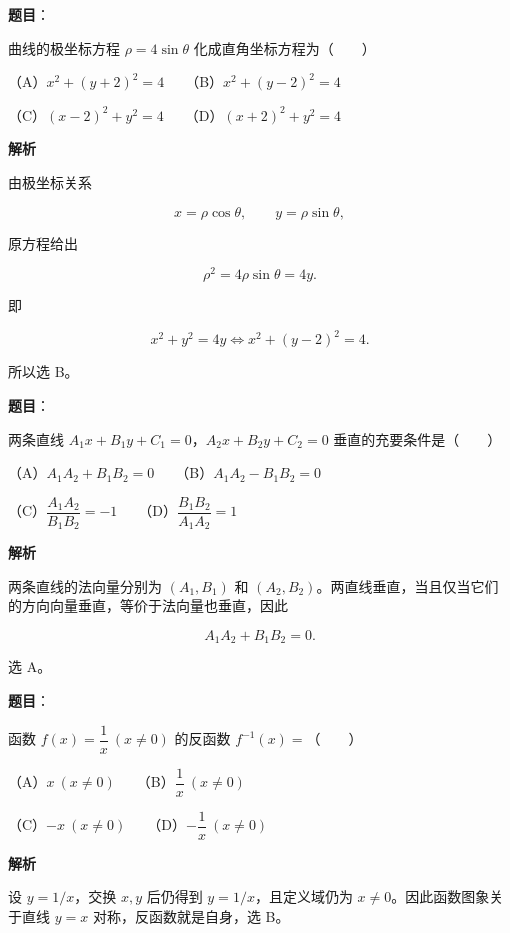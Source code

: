 \begin{answer}

\textbf{题目}：

曲线的极坐标方程 $\rho=4\sin\theta$ 化成直角坐标方程为\mbox{（　　）}

（A）$x^2+(y+2)^2=4$　　（B）$x^2+(y-2)^2=4$

（C）$(x-2)^2+y^2=4$　　（D）$(x+2)^2+y^2=4$

\textbf{解析}

由极坐标关系

\nopagebreak[4]
\[
x=\rho\cos\theta,\qquad y=\rho\sin\theta,
\]

原方程给出

\nopagebreak[4]
\[
\rho^2=4\rho\sin\theta=4y.
\]

即

\nopagebreak[4]
\[
x^2+y^2=4y
\iff x^2+(y-2)^2=4.
\]

所以选 B。


\end{answer}
\begin{answer}

\textbf{题目}：

两条直线 $A_1x+B_1y+C_1=0$，$A_2x+B_2y+C_2=0$ 垂直的充要条件是\mbox{（　　）}

（A）$A_1A_2+B_1B_2=0$　　（B）$A_1A_2-B_1B_2=0$

（C）$\dfrac{A_1A_2}{B_1B_2}=-1$　　（D）$\dfrac{B_1B_2}{A_1A_2}=1$

\textbf{解析}

两条直线的法向量分别为 $(A_1,B_1)$ 和 $(A_2,B_2)$。两直线垂直，当且仅当它们的方向向量垂直，等价于法向量也垂直，因此

\nopagebreak[4]
\[
A_1A_2+B_1B_2=0.
\]

选 A。


\end{answer}
\begin{answer}

\textbf{题目}：

函数 $f(x)=\dfrac1x\ (x\neq0)$ 的反函数 $f^{-1}(x)=$\mbox{（　　）}

（A）$x\ (x\neq0)$　　（B）$\dfrac1x\ (x\neq0)$

（C）$-x\ (x\neq0)$　　（D）$-\dfrac1x\ (x\neq0)$

\textbf{解析}

设 $y=1/x$，交换 $x,y$ 后仍得到 $y=1/x$，且定义域仍为 $x\neq0$。因此函数图象关于直线 $y=x$ 对称，反函数就是自身，选 B。


\end{answer}
